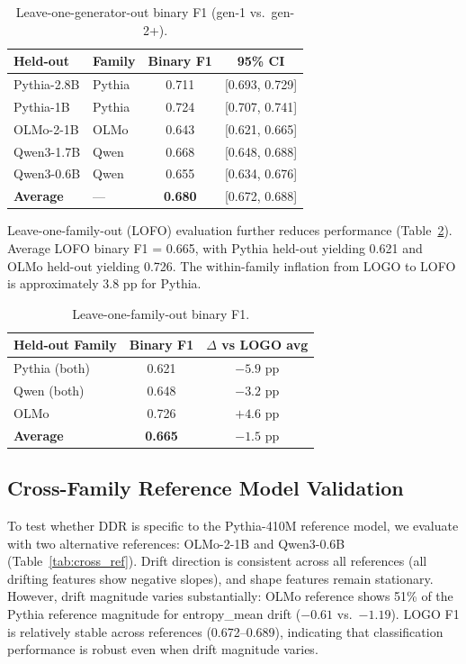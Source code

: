 \documentclass[11pt]{article}
\begin{document}
\begin{table}[t]
\centering
\small
\caption{Leave-one-generator-out binary F1 (gen-1 vs.\ gen-2+).}
\label{tab:logo}
\begin{tabular}{llcc}
\toprule
\textbf{Held-out} & \textbf{Family} & \textbf{Binary F1} & \textbf{95\% CI} \\
\midrule
Pythia-2.8B & Pythia & 0.711 & [0.693, 0.729] \\
Pythia-1B & Pythia & 0.724 & [0.707, 0.741] \\
OLMo-2-1B & OLMo & 0.643 & [0.621, 0.665] \\
Qwen3-1.7B & Qwen & 0.668 & [0.648, 0.688] \\
Qwen3-0.6B & Qwen & 0.655 & [0.634, 0.676] \\
\midrule
\textbf{Average} & --- & \textbf{0.680} & [0.672, 0.688] \\
\bottomrule
\end{tabular}
\end{table}

Leave-one-family-out (LOFO) evaluation further reduces performance (Table~\ref{tab:lofo}). Average LOFO binary F1 = 0.665, with Pythia held-out yielding 0.621 and OLMo held-out yielding 0.726. The within-family inflation from LOGO to LOFO is approximately 3.8 pp for Pythia.

\begin{table}[t]
\centering
\small
\caption{Leave-one-family-out binary F1.}
\label{tab:lofo}
\begin{tabular}{lcc}
\toprule
\textbf{Held-out Family} & \textbf{Binary F1} & \textbf{$\Delta$ vs LOGO avg} \\
\midrule
Pythia (both) & 0.621 & $-5.9$ pp \\
Qwen (both) & 0.648 & $-3.2$ pp \\
OLMo & 0.726 & $+4.6$ pp \\
\midrule
\textbf{Average} & \textbf{0.665} & $-1.5$ pp \\
\bottomrule
\end{tabular}
\end{table}

\subsection{Cross-Family Reference Model Validation}
\label{sec:cross_ref}

To test whether DDR is specific to the Pythia-410M reference model, we evaluate with two alternative references: OLMo-2-1B and Qwen3-0.6B (Table~\ref{tab:cross_ref}). Drift direction is consistent across all references (all drifting features show negative slopes), and shape features remain stationary. However, drift magnitude varies substantially: OLMo reference shows 51\% of the Pythia reference magnitude for entropy\_mean drift ($-0.61$ vs.\ $-1.19$). LOGO F1 is relatively stable across references (0.672--0.689), indicating that classification performance is robust even when drift magnitude varies.
\end{document}
